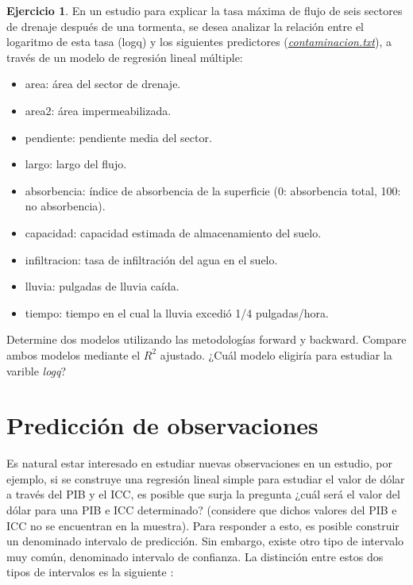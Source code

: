 \documentclass[
  11pt,
]{book}
\providecommand{\tightlist}{%
  \setlength{\itemsep}{0pt}\setlength{\parskip}{0pt}}
\theoremstyle{definition}
\theoremstyle{definition}
\theoremstyle{definition}
\newtheorem{exercise}{Ejercicio}[chapter]
\theoremstyle{definition}
\theoremstyle{remark}
\begin{document}
\begin{exercise}
\protect\hypertarget{exr:contaminacion}{}\label{exr:contaminacion}En un estudio para explicar la tasa máxima de flujo de seis sectores de drenaje después de una tormenta, se desea analizar la relación entre el logaritmo de esta tasa (logq) y los siguientes predictores (\href{https://raw.githubusercontent.com/Dfranzani/Bases-de-datos-para-cursos/main/2023-1/drenaje.txt}{\emph{contaminacion.txt}}), a través de un modelo de regresión lineal múltiple:

\begin{itemize}
\tightlist
\item
  area: área del sector de drenaje.
\item
  area2: área impermeabilizada.
\item
  pendiente: pendiente media del sector.
\item
  largo: largo del flujo.
\item
  absorbencia: índice de absorbencia de la superficie (0: absorbencia total, 100: no absorbencia).
\item
  capacidad: capacidad estimada de almacenamiento del suelo.
\item
  infiltracion: tasa de infiltración del agua en el suelo.
\item
  lluvia: pulgadas de lluvia caída.
\item
  tiempo: tiempo en el cual la lluvia excedió 1/4 pulgadas/hora.
\end{itemize}

Determine dos modelos utilizando las metodologías forward y backward. Compare ambos modelos mediante el \(R^2\) ajustado. ¿Cuál modelo eligiría para estudiar la varible \emph{logq}?
\end{exercise}

\section{Predicción de observaciones}\label{regresion-lineal-prediccion-observaciones}

Es natural estar interesado en estudiar nuevas observaciones en un estudio, por ejemplo, si se construye una regresión lineal simple para estudiar el valor de dólar a través del PIB y el ICC, es posible que surja la pregunta ¿cuál será el valor del dólar para una PIB e ICC determinado? (considere que dichos valores del PIB e ICC no se encuentran en la muestra). Para responder a esto, es posible construir un denominado intervalo de predicción. Sin embargo, existe otro tipo de intervalo muy común, denominado intervalo de confianza. La distinción entre estos dos tipos de intervalos es la siguiente \citep[página 125]{fahrmeir_regression_2013}:
\end{document}
